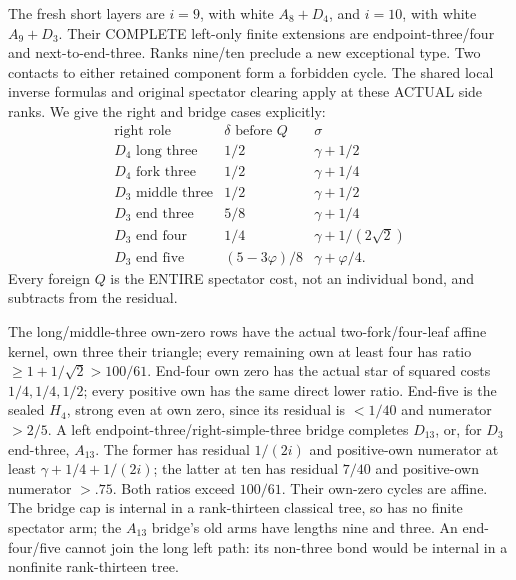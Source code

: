 \documentclass[11pt]{article}
\begin{document}
The fresh short layers are \(i=9\), with
white \(A_8+D_4\), and \(i=10\), with
white \(A_9+D_3\).
Their COMPLETE left-only finite extensions are
endpoint-three/four and next-to-end-three.
Ranks nine/ten preclude a new exceptional type.
Two contacts to either retained component form
a forbidden cycle.
The shared local inverse formulas and original
spectator clearing apply at these ACTUAL side ranks.
We give the right and bridge cases explicitly:
\[
\begin{array}{c|c|c}
 \text{right role}&\delta\text{ before }Q&\sigma\\ \hline
 D_4\text{ long three}&1/2&\gamma+1/2\\
 D_4\text{ fork three}&1/2&\gamma+1/4\\
 D_3\text{ middle three}&1/2&\gamma+1/2\\
 D_3\text{ end three}&5/8&\gamma+1/4\\
 D_3\text{ end four}&1/4&\gamma+1/(2\sqrt2)\\
 D_3\text{ end five}&(5-3\varphi)/8&\gamma+\varphi/4 .
\end{array}
\]
Every foreign \(Q\) is the ENTIRE spectator cost,
not an individual bond, and subtracts from the residual.

The long/middle-three own-zero rows have the actual
two-fork/four-leaf affine kernel, own three their
triangle; every remaining own at least four has
ratio \(\ge1+1/\sqrt2>100/61\).
End-four own zero has the actual star of squared
costs \(1/4,1/4,1/2\); every positive own has
the same direct lower ratio.
End-five is the sealed \(H_4\), strong even at
own zero, since its residual is \(<1/40\)
and numerator \(>2/5\).
A left endpoint-three/right-simple-three bridge
completes \(D_{13}\), or, for \(D_3\) end-three,
\(A_{13}\).
The former has residual \(1/(2i)\) and positive-own
numerator at least \(\gamma+1/4+1/(2i)\);
the latter at ten has residual \(7/40\) and
positive-own numerator \(>.75\).
Both ratios exceed \(100/61\).
Their own-zero cycles are affine.
The bridge cap is internal in a rank-thirteen
classical tree, so has no finite spectator arm;
the \(A_{13}\) bridge's old arms have lengths
nine and three.
An end-four/five cannot join the long left path:
its non-three bond would be internal in a
nonfinite rank-thirteen tree.
\end{document}
